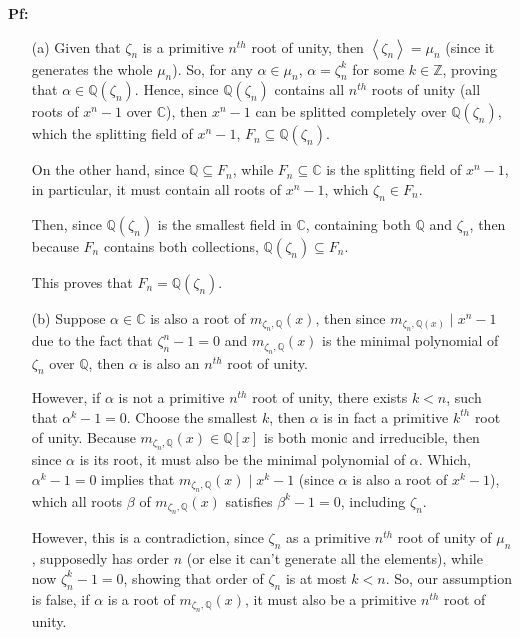 \documentclass{article}
\begin{document}
\textbf{Pf:}
\begin{itemize}
    \item[(a)] Given that $\zeta_n$ is a primitive $n^{th}$ root of unity, then $\left<\zeta_n\right>=\mu_n$ (since it generates the whole $\mu_n$).
    So, for any $\alpha\in \mu_n$, $\alpha=\zeta_n^k$ for some $k\in\mathbb{Z}$, proving that $\alpha\in\mathbb{Q}(\zeta_n)$. Hence, since $\mathbb{Q}(\zeta_n)$ contains all $n^{th}$ roots of unity (all roots of $x^n-1$ over $\mathbb{C}$),
    then $x^n-1$ can be splitted completely over $\mathbb{Q}(\zeta_n)$, which the splitting field of $x^n-1$, $F_n\subseteq \mathbb{Q}(\zeta_n)$.

    On the other hand, since $\mathbb{Q}\subseteq F_n$, while $F_n\subseteq\mathbb{C}$ is the splitting field of $x^n-1$, in particular, it must contain all roots of $x^n-1$, which $\zeta_n\in F_n$.

    Then, since $\mathbb{Q}(\zeta_n)$ is the smallest field in $\mathbb{C}$, containing both $\mathbb{Q}$ and $\zeta_n$, then because $F_n$ contains both collections, $\mathbb{Q}(\zeta_n)\subseteq F_n$.

    This proves that $F_n=\mathbb{Q}(\zeta_n)$.

    \hfil

    \item[(b)] Suppose $\alpha\in\mathbb{C}$ is also a root of $m_{\zeta_n,\mathbb{Q}}(x)$, then since $m_{\zeta_n,\mathbb{Q}(x)}\mid x^n-1$ due to the fact that $\zeta_n^n-1=0$ and $m_{\zeta_n,\mathbb{Q}}(x)$ is the minimal polynomial of $\zeta_n$ over $\mathbb{Q}$, then $\alpha$ is also an $n^{th}$ root of unity.
    
    However, if $\alpha$ is not a primitive $n^{th}$ root of unity, there exists $k<n$, such that $\alpha^k-1=0$. Choose the smallest $k$, then $\alpha$ is in fact a primitive $k^{th}$ root of unity.
    Because $m_{\zeta_n,\mathbb{Q}}(x)\in\mathbb{Q}[x]$ is both monic and irreducible, then since $\alpha$ is its root, it must also be the minimal polynomial of $\alpha$. Which, $\alpha^k-1=0$ implies that $m_{\zeta_n,\mathbb{Q}}(x)\mid x^k-1$ (since $\alpha$ is also a root of $x^k-1$),
    which all roots $\beta$ of $m_{\zeta_n,\mathbb{Q}}(x)$ satisfies $\beta^k-1=0$, including $\zeta_n$.

    However, this is a contradiction, since $\zeta_n$ as a primitive $n^{th}$ root of unity of $\mu_n$, supposedly has order $n$ (or else it can't generate all the elements), while now $\zeta_n^k-1=0$, showing that order of $\zeta_n$ is at most $k<n$.
    So, our assumption is false, if $\alpha$ is a root of $m_{\zeta_n,\mathbb{Q}}(x)$, it must also be a primitive $n^{th}$ root of unity.
    

\end{itemize}
\end{document}
